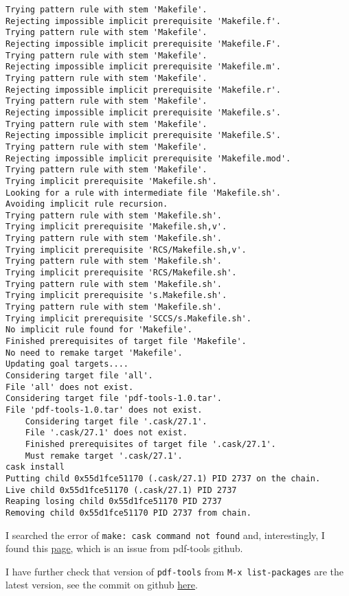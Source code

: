 \documentclass[11pt]{article}
\begin{document}
\begin{enumerate}
\begin{enumerate}
\begin{verbatim}
Trying pattern rule with stem 'Makefile'.
Rejecting impossible implicit prerequisite 'Makefile.f'.
Trying pattern rule with stem 'Makefile'.
Rejecting impossible implicit prerequisite 'Makefile.F'.
Trying pattern rule with stem 'Makefile'.
Rejecting impossible implicit prerequisite 'Makefile.m'.
Trying pattern rule with stem 'Makefile'.
Rejecting impossible implicit prerequisite 'Makefile.r'.
Trying pattern rule with stem 'Makefile'.
Rejecting impossible implicit prerequisite 'Makefile.s'.
Trying pattern rule with stem 'Makefile'.
Rejecting impossible implicit prerequisite 'Makefile.S'.
Trying pattern rule with stem 'Makefile'.
Rejecting impossible implicit prerequisite 'Makefile.mod'.
Trying pattern rule with stem 'Makefile'.
Trying implicit prerequisite 'Makefile.sh'.
Looking for a rule with intermediate file 'Makefile.sh'.
Avoiding implicit rule recursion.
Trying pattern rule with stem 'Makefile.sh'.
Trying implicit prerequisite 'Makefile.sh,v'.
Trying pattern rule with stem 'Makefile.sh'.
Trying implicit prerequisite 'RCS/Makefile.sh,v'.
Trying pattern rule with stem 'Makefile.sh'.
Trying implicit prerequisite 'RCS/Makefile.sh'.
Trying pattern rule with stem 'Makefile.sh'.
Trying implicit prerequisite 's.Makefile.sh'.
Trying pattern rule with stem 'Makefile.sh'.
Trying implicit prerequisite 'SCCS/s.Makefile.sh'.
No implicit rule found for 'Makefile'.
Finished prerequisites of target file 'Makefile'.
No need to remake target 'Makefile'.
Updating goal targets....
Considering target file 'all'.
File 'all' does not exist.
Considering target file 'pdf-tools-1.0.tar'.
File 'pdf-tools-1.0.tar' does not exist.
    Considering target file '.cask/27.1'.
    File '.cask/27.1' does not exist.
    Finished prerequisites of target file '.cask/27.1'.
    Must remake target '.cask/27.1'.
cask install
Putting child 0x55d1fce51170 (.cask/27.1) PID 2737 on the chain.
Live child 0x55d1fce51170 (.cask/27.1) PID 2737
Reaping losing child 0x55d1fce51170 PID 2737
Removing child 0x55d1fce51170 PID 2737 from chain.
\end{verbatim}

I searched the error of \texttt{make: cask command not found} and, interestingly, I found this \href{https://github.com/politza/pdf-tools/issues/335}{page}, which is an issue from pdf-tools github.

I have further check that version of \texttt{pdf-tools} from \texttt{M-x list-packages} are the latest version, see the commit on github \href{https://github.com/vedang/pdf-tools/tree/a8847b75d3487d60e27762816bdbdd23b6dc1c11}{here}.


\end{enumerate}
\end{enumerate}
\end{document}
